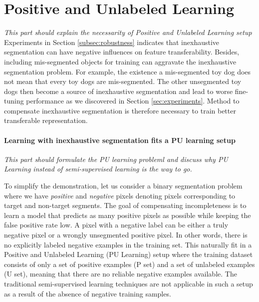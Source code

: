 \section{Positive and Unlabeled Learning}
\label{sec:pulearning}

\noindent \textit{This part should explain the necessarity of Positive and Unlabeled Learning setup}
\noindent
Experiments in Section \ref{subsec:robustness} indicates that inexhaustive segmentation can have negative influences on feature transferability.
Besides, including mis-segmented objects for training can aggravate the inexhaustive segmentation problem.
For example, the existence a mis-segmented toy dog does not mean that every toy dogs are mis-segmented.
The other unsegmented toy dogs then become a source of inexhaustive segmentation and lead to worse fine-tuning performance as we discovered in Section \ref{sec:experiments}.
Method to compensate inexhaustive segmentation is therefore necessary to train better transferable representation.

\paragraph{Learning with inexhaustive segmentation fits a PU learning setup}
\noindent \textit{This part should formulate the PU learning probleml and discuss why PU Learning instead of semi-supervised learning is the way to go.}

\noindent
To simplify the demonstration, let us consider a binary segmentation problem where we have \textit{positive} and \textit{negative} pixels denoting pixels corresponding to target and non-target segments.
The goal of compensating incompleteness is to learn a model that predicts as many positive pixels as possible while keeping the false positive rate low.
A pixel with a negative label can be either a truly negative pixel or a wrongly unsegmented positive pixel.
In other words, there is no explicitly labeled negative examples in the training set.
This naturally fit in a Positive and Unlabeled Learning (PU Learning) setup where the training dataset consists of only a set of positive examples (P set) and a set of unlabeled examples (U set), meaning that there are no reliable negative examples available.
The traditional semi-supervised learning techniques are not applicable in such a setup as a result of the absence of negative training samples.

